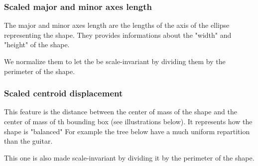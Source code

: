 \documentclass[12pt]{article}
\begin{document}
\subsubsection{Scaled major and minor axes length}

The major and minor axes length are the lengths of the axis of the ellipse representing the shape. They provides informations about the "width" and "height" of the shape.

We normalize them to let the be scale-invariant by dividing them by the perimeter of the shape.

\subsubsection{Scaled centroid displacement}

This feature is the distance between the center of mass of the shape and the center of mass of th bounding box (see illustrations below). It represents how the shape is "balanced" For example the tree below have a much uniform repartition than the guitar.

This one is also made scale-invariant by dividing it by the perimeter of the shape.
\end{document}
